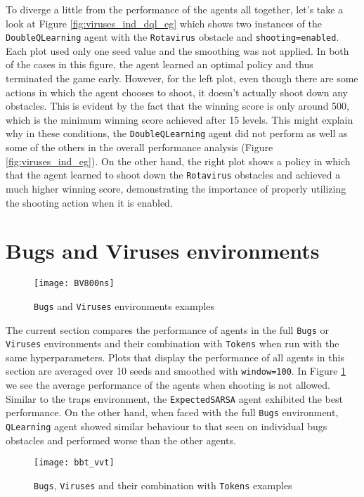 To diverge a little from the performance of the agents all together, let's take a look at Figure \ref{fig:viruses_ind_dql_eg} which shows two instances of the \texttt{DoubleQLearning} agent with the \texttt{Rotavirus} obstacle and \texttt{shooting=enabled}. Each plot used only one seed value and the smoothing was not applied. In both of the cases in this figure, the agent learned an optimal policy and thus terminated the game early. However, for the left plot, even though there are some actions in which the agent chooses to shoot, it doesn't actually shoot down any obstacles. This is evident by the fact that the winning score is only around 500, which is the minimum winning score achieved after 15 levels.  This might explain why in these conditions, the \texttt{DoubleQLearning} agent did not perform as well as some of the others in the overall performance analysis (Figure \ref{fig:viruses_ind_eg}). On the other hand, the right plot shows a policy in which that the agent learned to shoot down the \texttt{Rotavirus} obstacles and achieved a much higher winning score, demonstrating the importance of properly utilizing the shooting action when it is enabled.

\section{Bugs and Viruses environments}
\begin{figure}[h]
    \centering
    \texttt{[image: BV800ns]}
    \caption{\texttt{Bugs} and \texttt{Viruses} environments examples}
    \label{fig:bv800ns_eg}
\end{figure}

The current section compares the performance of agents in the full \texttt{Bugs} or \texttt{Viruses} environments and their combination with \texttt{Tokens} when run with the same hyperparameters. Plots that display the performance of all agents in this section are averaged over 10 seeds and smoothed with \texttt{window=100}. In Figure \ref{fig:bv800ns_eg} we see the average performance of the agents when shooting is not allowed. Similar to the traps environment, the \texttt{ExpectedSARSA} agent exhibited the best performance. On the other hand, when faced with the full \texttt{Bugs} environment, \texttt{QLearning} agent showed similar behaviour to that seen on individual bugs obstacles and performed worse than the other agents.

\begin{figure}[h]
    \centering
    \texttt{[image: bbt\_vvt]}
    \caption{\texttt{Bugs}, \texttt{Viruses} and their combination with \texttt{Tokens} examples}
    \label{fig:bbt_vvt_eg}
\end{figure}

